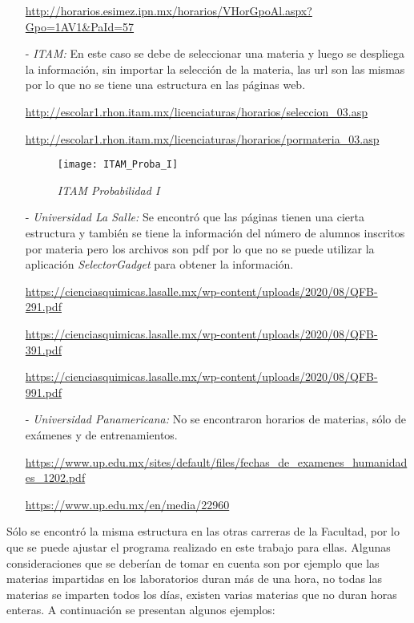 \begin{itemize}
\url{http://horarios.esimez.ipn.mx/horarios/VHorGpoAl.aspx?Gpo=1AV1&PaId=57}




\item[-] \textit{ITAM:} En este caso se debe de seleccionar una materia y luego se despliega la información, sin importar la selección de la materia, las url son las mismas por lo que no se tiene una estructura en las páginas web.

\url{http://escolar1.rhon.itam.mx/licenciaturas/horarios/seleccion_03.asp}

\url{http://escolar1.rhon.itam.mx/licenciaturas/horarios/pormateria_03.asp}

\begin{figure}[H]
\centering
\texttt{[image: ITAM\_Proba\_I]} %
\caption{\textit{ITAM Probabilidad I}}
\end{figure}


\item[-] \textit{Universidad La Salle:} Se encontró que las páginas tienen una cierta estructura y también se tiene la información del número de alumnos inscritos por materia pero los archivos son pdf por lo que no se puede utilizar la aplicación \textit{SelectorGadget} para obtener la información.

\url{https://cienciasquimicas.lasalle.mx/wp-content/uploads/2020/08/QFB-291.pdf}

\url{https://cienciasquimicas.lasalle.mx/wp-content/uploads/2020/08/QFB-391.pdf}

\url{https://cienciasquimicas.lasalle.mx/wp-content/uploads/2020/08/QFB-991.pdf}


\item[-] \textit{Universidad Panamericana:} No se encontraron horarios de materias, sólo de exámenes y de entrenamientos.

\url{https://www.up.edu.mx/sites/default/files/fechas_de_examenes_humanidades_1202.pdf}

\url{https://www.up.edu.mx/en/media/22960}

\end{itemize}

Sólo se encontró la misma estructura en las otras carreras de la Facultad, por lo que se puede ajustar el programa realizado en este trabajo para ellas. Algunas consideraciones que se deberían de tomar en cuenta son por ejemplo que las materias impartidas en los laboratorios duran más de una hora, no todas las materias se imparten todos los días, existen varias materias que no duran horas enteras. A continuación se presentan algunos ejemplos:

